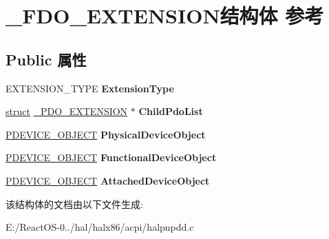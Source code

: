 \hypertarget{struct___f_d_o___e_x_t_e_n_s_i_o_n}{}\section{\+\_\+\+F\+D\+O\+\_\+\+E\+X\+T\+E\+N\+S\+I\+O\+N结构体 参考}
\label{struct___f_d_o___e_x_t_e_n_s_i_o_n}
\subsection*{Public 属性}
\begin{DoxyCompactItemize}
\item 
\mbox{\label{struct___f_d_o___e_x_t_e_n_s_i_o_n_a3947d6084601d8c288a02cd74389153f}} 
E\+X\+T\+E\+N\+S\+I\+O\+N\+\_\+\+T\+Y\+PE {\bfseries Extension\+Type}
\item 
\mbox{\label{struct___f_d_o___e_x_t_e_n_s_i_o_n_ae856b12098e13deab63e76183b148baf}} 
\hyperlink{interfacestruct}{struct} \hyperlink{struct___p_d_o___e_x_t_e_n_s_i_o_n}{\+\_\+\+P\+D\+O\+\_\+\+E\+X\+T\+E\+N\+S\+I\+ON} $\ast$ {\bfseries Child\+Pdo\+List}
\item 
\mbox{\label{struct___f_d_o___e_x_t_e_n_s_i_o_n_aeaa9787841f066c442921242e6ad3937}} 
\hyperlink{struct___d_e_v_i_c_e___o_b_j_e_c_t}{P\+D\+E\+V\+I\+C\+E\+\_\+\+O\+B\+J\+E\+CT} {\bfseries Physical\+Device\+Object}
\item 
\mbox{\label{struct___f_d_o___e_x_t_e_n_s_i_o_n_a176d9a4dc61ffd06b609a324e0936939}} 
\hyperlink{struct___d_e_v_i_c_e___o_b_j_e_c_t}{P\+D\+E\+V\+I\+C\+E\+\_\+\+O\+B\+J\+E\+CT} {\bfseries Functional\+Device\+Object}
\item 
\mbox{\label{struct___f_d_o___e_x_t_e_n_s_i_o_n_a2f121d3be8907157487fd98bcc58a3c4}} 
\hyperlink{struct___d_e_v_i_c_e___o_b_j_e_c_t}{P\+D\+E\+V\+I\+C\+E\+\_\+\+O\+B\+J\+E\+CT} {\bfseries Attached\+Device\+Object}
\end{DoxyCompactItemize}


该结构体的文档由以下文件生成\+:\begin{DoxyCompactItemize}
\item 
E\+:/\+React\+O\+S-\/0../hal/halx86/acpi/halpnpdd.\+c\end{DoxyCompactItemize}
